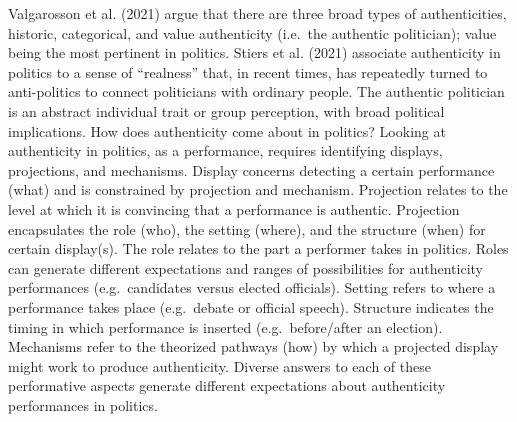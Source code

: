 \documentclass[smallextended]{svjour3}       %
\begin{document}
Valgarosson et al. (2021) argue that there are three broad types of
authenticities, historic, categorical, and value authenticity (i.e.~the
authentic politician); value being the most pertinent in politics.
Stiers et al. (2021) associate authenticity in politics to a sense of
``realness'' that, in recent times, has repeatedly turned to
anti-politics to connect politicians with ordinary people. The authentic
politician is an abstract individual trait or group perception, with
broad political implications. How does authenticity come about in
politics? Looking at authenticity in politics, as a performance,
requires identifying displays, projections, and mechanisms. Display
concerns detecting a certain performance (what) and is constrained by
projection and mechanism. Projection relates to the level at which it is
convincing that a performance is authentic. Projection encapsulates the
role (who), the setting (where), and the structure (when) for certain
display(s). The role relates to the part a performer takes in politics.
Roles can generate different expectations and ranges of possibilities
for authenticity performances (e.g.~candidates versus elected
officials). Setting refers to where a performance takes place
(e.g.~debate or official speech). Structure indicates the timing in
which performance is inserted (e.g.~before/after an election).
Mechanisms refer to the theorized pathways (how) by which a projected
display might work to produce authenticity. Diverse answers to each of
these performative aspects generate different expectations about
authenticity performances in politics.
\end{document}
